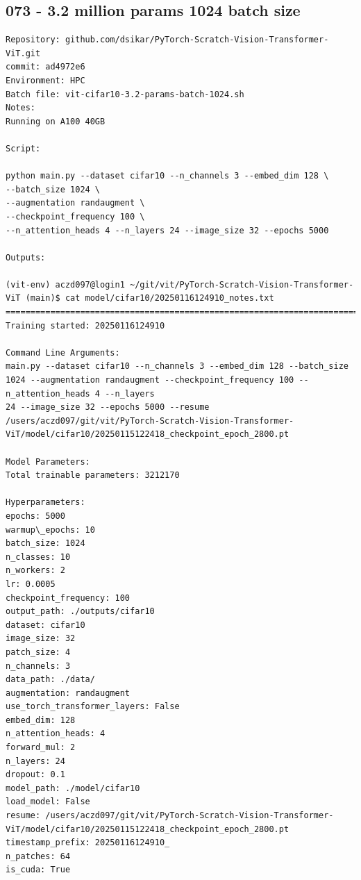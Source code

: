 
\subsection{073 - 3.2 million params 1024 batch size}
\label{app_res:073}
\begin{verbatim}
Repository: github.com/dsikar/PyTorch-Scratch-Vision-Transformer-ViT.git
commit: ad4972e6
Environment: HPC 
Batch file: vit-cifar10-3.2-params-batch-1024.sh
Notes: 
Running on A100 40GB

Script:

python main.py --dataset cifar10 --n_channels 3 --embed_dim 128 \
--batch_size 1024 \
--augmentation randaugment \
--checkpoint_frequency 100 \
--n_attention_heads 4 --n_layers 24 --image_size 32 --epochs 5000

Outputs:

(vit-env) aczd097@login1 ~/git/vit/PyTorch-Scratch-Vision-Transformer-ViT (main)$ cat model/cifar10/20250116124910_notes.txt
================================================================================
Training started: 20250116124910

Command Line Arguments:
main.py --dataset cifar10 --n_channels 3 --embed_dim 128 --batch_size 1024 --augmentation randaugment --checkpoint_frequency 100 --n_attention_heads 4 --n_layers 
24 --image_size 32 --epochs 5000 --resume /users/aczd097/git/vit/PyTorch-Scratch-Vision-Transformer-ViT/model/cifar10/20250115122418_checkpoint_epoch_2800.pt     

Model Parameters:
Total trainable parameters: 3212170

Hyperparameters:
epochs: 5000
warmup\_epochs: 10
batch_size: 1024
n_classes: 10
n_workers: 2
lr: 0.0005
checkpoint_frequency: 100
output_path: ./outputs/cifar10
dataset: cifar10
image_size: 32
patch_size: 4
n_channels: 3
data_path: ./data/
augmentation: randaugment
use_torch_transformer_layers: False
embed_dim: 128
n_attention_heads: 4
forward_mul: 2
n_layers: 24
dropout: 0.1
model_path: ./model/cifar10
load_model: False
resume: /users/aczd097/git/vit/PyTorch-Scratch-Vision-Transformer-ViT/model/cifar10/20250115122418_checkpoint_epoch_2800.pt
timestamp_prefix: 20250116124910_
n_patches: 64
is_cuda: True


\end{verbatim}
